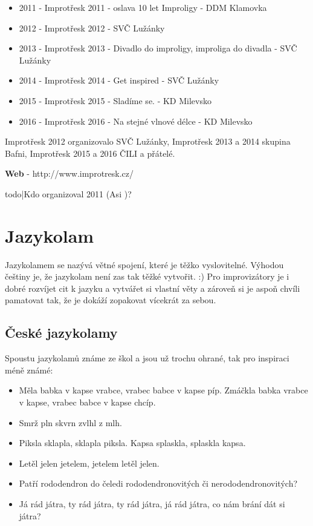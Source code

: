 \begin{itemize}
\item 2011 - Improtřesk 2011 - oslava 10 let Improligy - DDM Klamovka
\item 2012 - Improtřesk 2012 - SVČ Lužánky
\item 2013 - Improtřesk 2013 - Divadlo do improligy, improliga do divadla - SVČ Lužánky
\item 2014 - Improtřesk 2014 - Get inspired - SVČ Lužánky
\item 2015 - Improtřesk 2015 - Sladíme se.   - KD Milevsko
\item 2016 - Improtřesk 2016 - Na stejné vlnové délce - KD Milevsko
\end{itemize}
 
Improtřesk 2012 organizovalo SVČ Lužánky,  
Improtřesk 2013 a 2014 skupina Bafni, Improtřesk 2015 a 2016  ČILI a přátelé. 
 
\textbf{Web}{} - http://www.improtresk.cz/ 
 
{{todo|Kdo organizoval 2011 (Asi )?}} 
\needspace{5cm} \section{Jazykolam} \label{jazykolam} Jazykolamem se nazývá větné spojení, které je těžko vyslovitelné. Výhodou češtiny je, že jazykolam není zas tak těžké vytvořit. :) 
Pro improvizátory je i dobré rozvíjet cit k jazyku a vytvářet si vlastní věty a zároveň si je aspoň chvíli pamatovat tak, že je dokáží zopakovat vícekrát za sebou. 
 
 
\subsection{ České jazykolamy }  
Spoustu jazykolamů známe ze škol a jsou už trochu ohrané, tak pro inspiraci méně známé: 
 
\begin{itemize}
\item  Měla babka v kapse vrabce, vrabec babce v kapse píp. Zmáčkla babka vrabce v kapse, vrabec babce v kapse chcíp.
\item  Smrž pln skvrn zvlhl z mlh.
\item  Piksla sklapla, sklapla piksla. Kapsa splaskla, splaskla kapsa.
\item  Letěl jelen jetelem, jetelem letěl jelen.
\item  Patří rododendron do čeledi rododendronovitých či nerododendronovitých?
\item  Já rád játra, ty rád játra, ty rád játra, já rád játra, co nám brání dát si játra?
\end{itemize}
 
